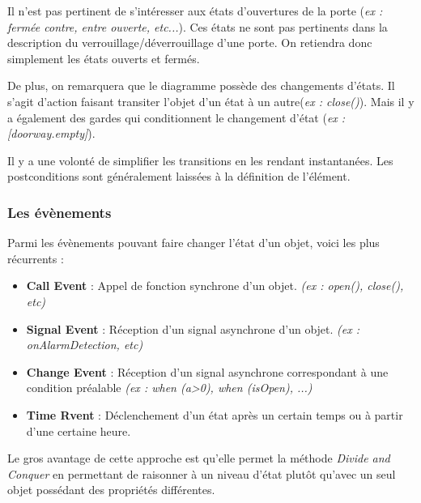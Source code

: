 \documentclass[../Syllabus.tex]{subfiles}
\begin{document}
\vspace{0.2cm}

\textrm{Il n'est pas pertinent de s'intéresser aux états d'ouvertures de la porte (\textit{ex : fermée contre, entre ouverte, etc...}). Ces états ne sont pas pertinents dans la description du verrouillage/déverrouillage d'une porte. On retiendra donc simplement les états ouverts et fermés.}

\vspace{0.2cm}

\textrm{De plus, on remarquera que le diagramme possède des changements d'états. Il s'agit d'action faisant transiter l'objet d'un état à un autre(\textit{ex : close()}). Mais il y a également des gardes qui conditionnent le changement d'état (\textit{ex : [doorway.empty]}).}


\vspace{1.5cm}

Il y a une volonté de simplifier les transitions en les rendant instantanées. Les postconditions sont généralement laissées à la définition de l'élément.

\subsubsection{Les évènements}

Parmi les évènements pouvant faire changer l'état d'un objet, voici les plus récurrents :

\begin{itemize}
    \item \textbf{Call Event} : Appel de fonction synchrone d'un objet. \textit{(ex : open(), close(), etc)}
    \item \textbf{Signal Event} : Réception d'un signal asynchrone d'un objet. \textit{(ex : onAlarmDetection, etc)}
    \item \textbf{Change Event} : Réception d'un signal asynchrone correspondant à une condition préalable \textit{(ex : when (a>0), when (isOpen), ...)}
    \item \textbf{Time Rvent} : Déclenchement d'un état après un certain temps ou à partir d'une certaine heure.
\end{itemize}

\vspace{0.2cm}

Le gros avantage de cette approche est qu'elle permet la méthode \textit{Divide and Conquer} en permettant de raisonner à un niveau d'état plutôt qu'avec un seul objet possédant des propriétés différentes.
\end{document}
